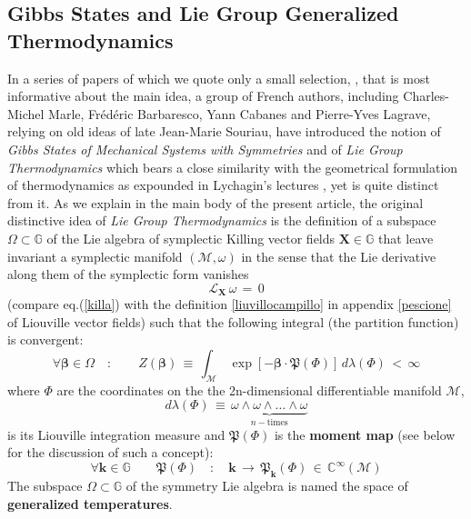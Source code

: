 \documentclass[10pt,a4paper]{article}
\begin{document}
\subsection{Gibbs States and Lie Group Generalized Thermodynamics}
\label{topolinothermo}
In a series of papers of which we quote only a small selection,
\cite{marlentropia,caldobarbaresco,barbaresco2,barbaresco3,marlegibbs}, that is most informative about the main idea, a group of  French authors, including  Charles-Michel Marle, Fr{\'e}d{\'e}ric Barbaresco, Yann Cabanes and Pierre-Yves Lagrave, relying on old ideas of late Jean-Marie Souriau, have introduced the notion of \textit{Gibbs States of Mechanical Systems with Symmetries} and of \textit{Lie Group Thermodynamics} which bears a close similarity with the geometrical formulation of thermodynamics as expounded in Lychagin's lectures \cite{lychaginlecture}, yet is
quite distinct from it. As we explain in the main body of the present article, the original distinctive idea of \textit{Lie Group Thermodynamics} is the definition of a subspace $\Omega \subset \mathbb{G}$ of the Lie algebra of symplectic Killing vector fields $\boldsymbol{X} \in \mathbb{G}$ that leave invariant a symplectic manifold $\left( \mathcal{M},\omega\right)$ in the sense that the Lie derivative along them of the symplectic form vanishes
\begin{equation}
\label{killa}
\mathcal{L}_{\mathbf{X}} \, \omega \, = \,0
\end{equation}(compare eq.(\ref{killa}) with the definition \ref{liuvillocampillo} in appendix \ref{pescione} of Liouville vector fields) such that the following integral (the partition function) is convergent:
\begin{equation}\label{candelabro}
 \forall \boldsymbol{\beta} \in \Omega \quad : \quad \quad Z(\boldsymbol{\beta}) \, \equiv \, \int_\mathcal{M} \, \exp\left[-\boldsymbol{\beta}\cdot \boldsymbol{\mathfrak{P}}(\Phi) \right] \, d\lambda(\Phi) \, < \, \infty
\end{equation}
where $\Phi$ are the coordinates on the the 2n-dimensional differentiable manifold $\mathcal{M}$,
\begin{equation}\label{grafomane}
  d\lambda(\Phi) \, \equiv \, \underbrace{\omega \wedge \omega \wedge \dots \wedge \omega}_{n-\text{times}}
\end{equation}
is its Liouville integration measure and $\boldsymbol{\mathfrak{P}}(\Phi)$ is the \textbf{moment map} (see below for the discussion of such a concept):
\begin{equation}\label{lagradisca}
\forall \boldsymbol{k} \in \mathbb{G} \quad\quad  \boldsymbol{\mathfrak{P}}(\Phi) \quad : \quad \boldsymbol{k} \, \longrightarrow \, \boldsymbol{\mathfrak{P}}_{\mathbf{k}}(\Phi) \, \in \, \mathbb{C}^\infty (\mathcal{M})
\end{equation}
The subspace $\Omega \subset \mathbb{G}$ of the symmetry Lie algebra is named the space of \textbf{generalized temperatures}.
\end{document}
